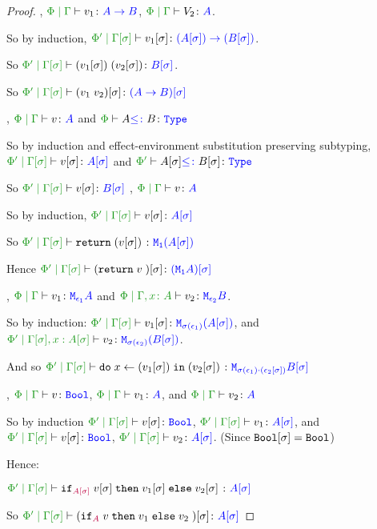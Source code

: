 \documentclass{report}
\begin{document}
\begin{framed}
\begin{proof}
    \case{\vapply}
    \bi, $\gpetyperelation{v_1}{\ab}$, $\gpetyperelation{V_2}{A}$.
    
    So by induction, $\etyperelation{\P'}{\G\ssi}{v_1\ssi}{\fntype{(A\ssi)}{(B\ssi)}}$.
    
    So $\etyperelation{\P'}{\G\ssi}{\apply{(v_1\ssi)}{(v_2\ssi)}}{B\ssi}$.
    
    So $\etyperelation{\P'}{\G\ssi}{(\apply{v_1}{v_2})\ssi}{(\ab)\ssi}$
    \case{\vsubtype}
    
    \bi, $\gpetyperelation{v}{A}$ and $\wellformedt{\P}{A\subtype B}$
    
    So by induction and effect-environment substitution preserving subtyping, $\etyperelation{\P'}{\G\ssi}{v\ssi}{A\ssi}$ and $\wellformedt{\P'}{A\ssi\subtype B\ssi}$
    
    So $\etyperelation{\P'}{\G\ssi}{v\ssi}{B\ssi}$
    \case{\vreturn}
    \bi, $\gpetyperelation{v}{A}$
    
    So by induction, $\etyperelation{\P'}{\G\ssi}{v\ssi}{A\ssi}$
    
    So $\etyperelation{\P'}{\G\ssi}{\return{(v\ssi)}}{\M{\1}{(A\ssi)}}$
    
    Hence $\etyperelation{\P'}{\G\ssi}{(\return{v})\ssi}{(\moa)\ssi}$
    \case{\vbind}
    
    \bi, $\gpetyperelation{v_1}{\M{\e_1}{A}}$ and $\etyperelation{\P}{\gax}{v_2}{\M{\e_2}{B}}$.
    
    So by induction: $\etyperelation{\P'}{\G\ssi}{v_1\ssi}{\M{\si(\e_1)}{(A\ssi)}}$, and $\etyperelation{\P'}{\G\ssi, x:A\ssi}{v_2}{\M{\si(\e_2)}{(B\ssi)}}$.
    
    And so $\etyperelation{\P'}{\G\ssi}{\doin{x}{(v_1\ssi)}{(v_2\ssi)}}{\M{\si(\e_1)\dot(\e_2\ssi)}{B\ssi}}$
    
    
    \case{\vif}
    
    \bi, $\gpetyperelation{v}{\B}$, $\gpetyperelation{v_1}{A}$, and $\gpetyperelation{v_2}{A}$
    
    So by induction $\etyperelation{\P'}{\G\ssi}{v\ssi}{\B}$, $\etyperelation{\P'}{\G\ssi}{v_1}{A\ssi}$, and $\etyperelation{\P'}{\G\ssi}{v\ssi}{\B}$, $\etyperelation{\P'}{\G\ssi}{v_2}{A\ssi}$.
    (Since $\texttt{Bool}[\sigma] = \texttt{Bool}$)
    
    Hence:
    
    $\etyperelation{\P'}{\G\ssi}{\pifthenelse{A\ssi}{v\ssi}{v_1\ssi}{v_2\ssi}}{A\ssi}$
    
    So $\etyperelation{\P'}{\G\ssi}{(\pifthenelse{A}{v}{v_1}{v_2})\ssi}{A\ssi}$
    

\end{proof}
\end{framed}
\end{document}
